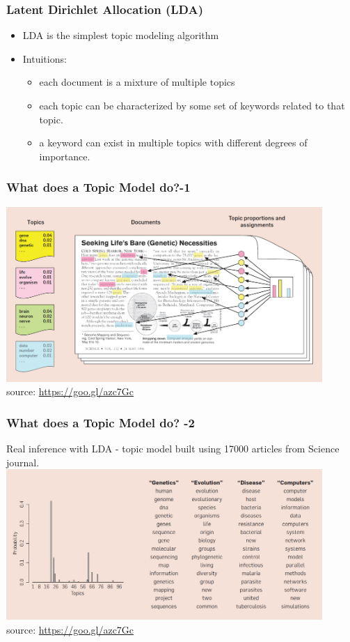 \documentclass{beamer}
\begin{document}
\begin{frame}
\frametitle{Latent Dirichlet Allocation (LDA)}
\begin{itemize}
\item LDA is the simplest topic modeling algorithm
\item Intuitions: 
\begin{itemize}
\item each document is a mixture of multiple topics
\item each topic can be characterized by some set of keywords related to that topic. 
\item a keyword can exist in multiple topics with different degrees of importance.
\end{itemize}
\end{itemize}
\end{frame}

\begin{frame}
\frametitle{What does a Topic Model do?-1}
\includegraphics[width=0.9\textwidth]{topicmodelexample.jpg}
\footnotesize \\ source: \url{https://goo.gl/azc7Gc}
\end{frame}

\begin{frame}
\frametitle{What does a Topic Model do? -2}
Real inference with LDA - topic model built using 17000 articles from Science journal.
\includegraphics[width=0.9\textwidth]{topics2.jpeg}
\footnotesize \\ source: \url{https://goo.gl/azc7Gc}
\end{frame}
\end{document}

